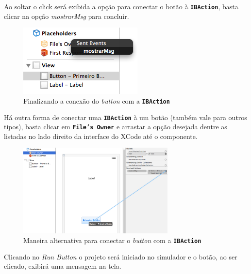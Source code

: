 \documentclass[a4paper,12pt,brazil,oneside]{book}
\begin{document}
Ao soltar o click será exibida a opção para conectar o botão à \texttt{\textbf{IBAction}}, basta clicar na opção \emph{mostrarMsg} para concluir.

\begin{figure}[H]
  \centering
  \includegraphics[scale=1]{figuras/3/tela_novo_projeto_24.png}
  \caption{Finalizando a conexão do \emph{button} com a \texttt{\textbf{IBAction}}}
  \label{fig:a}
\end{figure}

Há outra forma de conectar uma \texttt{\textbf{IBAction}} à um botão (também vale para outros tipos), basta clicar em \texttt{\textbf{File's Owner}} e arrastar a opção desejada dentre as listadas no lado direito da interface do XCode até o componente.

\begin{figure}[H]
  \centering
  \includegraphics[width=0.7\textwidth]{figuras/3/tela_novo_projeto_52.png}
  \caption{Maneira alternativa para conectar o \emph{button} com a \texttt{\textbf{IBAction}}}
  \label{fig:a}
\end{figure}

Clicando no \emph{Run Button} o projeto será iniciado no simulador e o botão, ao ser clicado, exibirá uma mensagem na tela.
\end{document}
